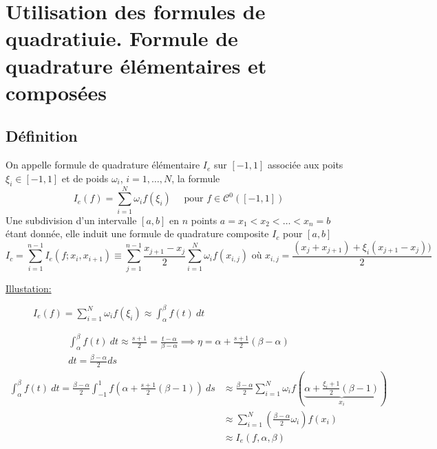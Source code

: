 \section{Utilisation des formules de quadratiuie. Formule de quadrature élémentaires et composées}
\subsection{Définition}
On appelle formule de quadrature élémentaire $I_e$ sur  $[-1, 1]$ associée aux poits  $\xi_i \in [-1, 1]$ et de poids $\omega_i$,  $i = 1, \ldots, N$, la formule
\[
    I_e(f) = \sum_{i=1}^{N} \omega_if(\xi_i) \quad \text{ pour } f \in \mathcal{C}^0([-1, 1])
\] 
Une subdivision d'un intervalle $[a, b]$ en  $n$ points  $a = x_1 < x_2 < \ldots < x_n = b$ étant donnée, elle induit une formule de quadrature composite $I_c$ pour  $[a, b]$ 
\[
I_c = \sum_{i=1}^{n-1} I_e(f; x_i, x_{i+1}) \equiv \sum_{j=1}^{n-1} \frac{x_{j+1} - x_{j}}{2}\sum_{i=1}^{N} \omega_{i}f(x_{i,j}) \text{ où } x_{i, j} = \frac{(x_j + x_{j+1}) + \xi_{i}(x_{j+1} - x_j))}{2}
\] 

\underline{Illustation:}
\begin{figure}[H]
    \centering
    \caption{$I_e(f) = \sum_{i=1}^{N} \omega_if(\xi_i) \approx \int_{{\alpha}}^{{\beta}} {f(t)} \: d{t} {}$}
    \label{fig:illustration-de-l-integrale}
\end{figure}
\begin{align*}
    \int_{{\alpha}}^{{\beta}} {f(t)} \: d{t} \approx \frac{s+1}{2}=\frac{t-\alpha}{\beta - \alpha} \implies \eta = \alpha + \frac{s+1}{2}(\beta - \alpha)\\
    dt = \frac{\beta - \alpha}{2} ds
\end{align*}
\begin{align*}
    \int_{{\alpha}}^{{\beta}} {f(t)} \: d{t} = \frac{\beta - \alpha}{2} \int_{{-1}}^{{1}} {f(\alpha + \frac{s+1}{2}(\beta - 1))} \: d{s} &\approx \frac{\beta - \alpha}{2}\sum_{i=1}^{N} \omega_if(\underbrace{ \alpha + \frac{\xi_{i}+1}{2}(\beta - 1) }_{x_i})\\
                                                                                                                                         &\approx \sum_{i=1}^{N} \left( \frac{\beta - \alpha}{2}\omega_i \right) f(x_i)\\
                                                                                                                                         &\approx I_e(f, \alpha, \beta)
\end{align*}

